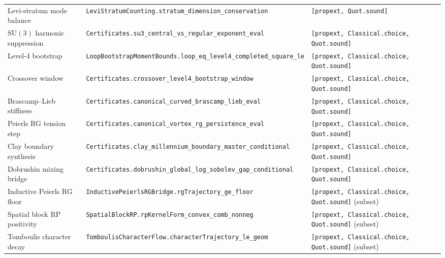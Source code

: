 \documentclass[11pt,a4paper]{article}
\newcommand{\SU}{\mathrm{SU}}
\begin{document}
\begin{table}[ht]
\begin{tabular}{@{}p{4.3cm}p{6.6cm}p{3.4cm}@{}}
Levi-stratum mode balance & \texttt{LeviStratumCounting.}\newline\texttt{stratum\_dimension\_conservation} & \texttt{[propext, Quot.sound]} \\
$\SU(3)$ harmonic suppression & \texttt{Certificates.}\newline\texttt{su3\_central\_vs\_regular\_exponent\_eval} & \texttt{[propext, Classical.choice,} \texttt{Quot.sound]} \\
Level-4 bootstrap & \texttt{LoopBootstrapMomentBounds.}\newline\texttt{loop\_eq\_level4\_completed\_square\_le} & \texttt{[propext, Classical.choice,} \texttt{Quot.sound]} \\
Crossover window & \texttt{Certificates.}\newline\texttt{crossover\_level4\_bootstrap\_window} & \texttt{[propext, Classical.choice,} \texttt{Quot.sound]} \\
Brascamp--Lieb stiffness & \texttt{Certificates.}\newline\texttt{canonical\_curved\_brascamp\_lieb\_eval} & \texttt{[propext, Classical.choice,} \texttt{Quot.sound]} \\
Peierls RG tension step & \texttt{Certificates.}\newline\texttt{canonical\_vortex\_rg\_persistence\_eval} & \texttt{[propext, Classical.choice,} \texttt{Quot.sound]} \\
Clay boundary synthesis & \texttt{Certificates.}\newline\texttt{clay\_millennium\_boundary\_master\_conditional} & \texttt{[propext, Classical.choice,} \texttt{Quot.sound]} \\
Dobrushin mixing bridge & \texttt{Certificates.}\newline\texttt{dobrushin\_global\_log\_sobolev\_gap\_conditional} & \texttt{[propext, Classical.choice,} \texttt{Quot.sound]} \\
Inductive Peierls RG floor & \texttt{InductivePeierlsRGBridge.}\newline\texttt{rgTrajectory\_ge\_floor} & \texttt{[propext, Classical.choice,} \texttt{Quot.sound]} (subset) \\
Spatial block RP positivity & \texttt{SpatialBlockRP.}\newline\texttt{rpKernelForm\_convex\_comb\_nonneg} & \texttt{[propext, Classical.choice,} \texttt{Quot.sound]} (subset) \\
Tomboulis character decay & \texttt{TomboulisCharacterFlow.}\newline\texttt{characterTrajectory\_le\_geom} & \texttt{[propext, Classical.choice,} \texttt{Quot.sound]} (subset) \\

\end{tabular}
\end{table}
\end{document}
